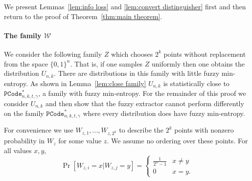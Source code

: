 \noindent
We present Lemmas~\ref{lem:info loss} and \ref{lem:convert distinguisher} first and then return to the proof of Theorem~\ref{thm:main theorem}.

\paragraph{The family $\mathcal{W}$}
We consider the following family $Z$ which chooses $2^k$ points without replacement from the space $\{0,1\}^n$.  That is, if one samples $Z$ uniformly then one obtains the distribution $U_{n,k}$. There are distributions in this family with little fuzzy min-entropy.  As shown in Lemma~\ref{lem:close family} $U_{n,k}$  is statistically close to $\mathtt{PCode}_{n, k, t, \gamma}^{*}$, a family with fuzzy min-entropy.  For the remainder of this proof we consider $U_{n,k}$ and then show that the fuzzy extractor cannot perform differently on the family $\mathtt{PCode}_{n, k, t, \gamma}^{*}$ where every distribution does have fuzzy min-entropy. 

For convenience we use $W_{z, 1},..., W_{z,2^k}$ to describe the $2^k$ points with nonzero probability in $W_z$ for some value $z$.  We assume no ordering over these points.  For all values $x, y$, 
\[
\Pr[W_{z, i} =x | W_{z, j} = y] = \begin{cases} \frac{1}{2^n-1} &x\neq y\\0&x=y.\end{cases}
\]


